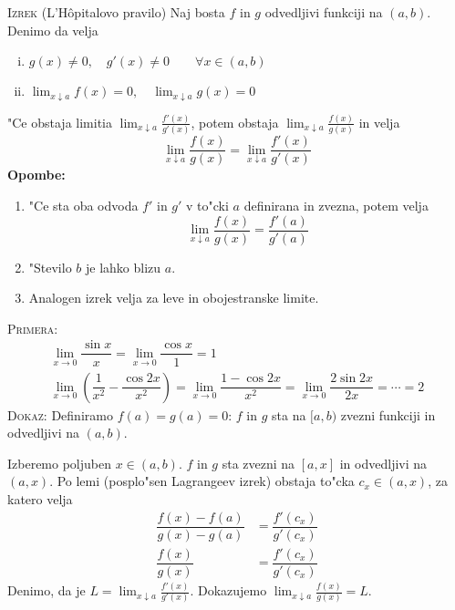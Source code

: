 \textsc{Izrek} (L'H\^{o}pitalovo pravilo) Naj bosta $f$ in $g$ odvedljivi funkciji na $(a, b)$. Denimo da velja
\begin{enumerate}[(i)]
	\item $g(x) \neq 0, \quad g'(x) \neq 0 \qquad \forall x \in (a, b)$
	\item $\lim_{x \downarrow a} f(x) = 0, \quad \lim_{x \downarrow a} g(x) = 0$
\end{enumerate}
"Ce obstaja limitia $\lim_{x \downarrow a} \frac{f'(x)}{g'(x)}$, potem obstaja $\lim_{x \downarrow a} \frac{f(x)}{g(x)}$ in velja
\begin{equation*}
\lim_{x \downarrow a} \frac{f(x)}{g(x)} = \lim_{x \downarrow a} \frac{f'(x)}{g'(x)}
\end{equation*}
\textbf{Opombe:}
\begin{enumerate}
	\item "Ce sta oba odvoda $f'$ in $g'$ v to"cki $a$ definirana in zvezna, potem velja
	\begin{equation*}
	\lim_{x \downarrow a} \frac{f(x)}{g(x)} = \dfrac{f'(a)}{g'(a)}
	\end{equation*}

	\item "Stevilo $b$ je lahko blizu $a$.
	\item Analogen izrek velja za leve in obojestranske limite.
\end{enumerate}
\textsc{Primera:}
\begin{gather*}
\lim_{x \to 0} \dfrac{\sin x}{x} = \lim_{x \to 0} \dfrac{\cos x}{1} = 1 \\
\lim_{x \to 0} \left(\dfrac{1}{x^2} - \dfrac{\cos 2x}{x^2}\right) = \lim_{x \to 0} \dfrac{1 - \cos 2x}{x^2} = \lim_{x \to 0} \dfrac{2\sin 2x}{2x} = \cdots = 2
\end{gather*}
\textsc{Dokaz:} Definiramo $f(a) = g(a) = 0$: $f$ in $g$ sta na $[a, b)$ zvezni funkciji in odvedljivi na $(a, b)$. 

Izberemo poljuben $x \in (a, b)$. $f$ in $g$ sta zvezni na $[a, x]$ in odvedljivi na $(a, x)$. Po lemi (posplo"sen Lagrangeev izrek) obstaja to"cka $c_x \in (a, x)$, za katero velja
\begin{align*}
\dfrac{f(x) - f(a)}{g(x) - g(a)} &= \dfrac{f'(c_x)}{g'(c_x)} \\
\dfrac{f(x)}{g(x)} &= \dfrac{f'(c_x)}{g'(c_x)}
\end{align*}
Denimo, da je $L = \lim_{x \downarrow a} \frac{f'(x)}{g'(x)}$. Dokazujemo $\lim_{x \downarrow a} \frac{f(x)}{g(x)} = L$.


